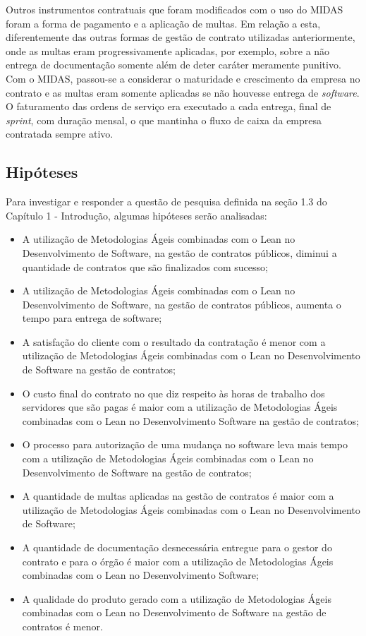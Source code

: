 Outros instrumentos contratuais que foram modificados com o uso do MIDAS foram a forma de pagamento e a aplicação de multas. Em relação a esta, diferentemente das outras formas de gestão de contrato utilizadas anteriormente, onde as multas eram progressivamente aplicadas, por exemplo, sobre a não entrega de documentação somente além de deter caráter meramente punitivo. Com o MIDAS, passou-se a considerar o maturidade e crescimento da empresa no contrato e as multas eram somente aplicadas se não houvesse entrega de \textit{software}. O faturamento das ordens de serviço era executado a cada entrega, final de \textit{sprint}, com duração mensal, o que mantinha o fluxo de caixa da empresa contratada sempre ativo.

\subsection[Hipóteses]{Hipóteses}

Para investigar e responder a questão de pesquisa definida na seção 1.3 do Capítulo 1 - Introdução, algumas hipóteses serão analisadas:
\begin{itemize}
\item  A utilização de Metodologias Ágeis combinadas com o Lean no Desenvolvimento de Software, na gestão de contratos públicos, diminui a quantidade de contratos que são finalizados com sucesso;
\item  A utilização de Metodologias Ágeis combinadas com o Lean no Desenvolvimento de Software, na gestão de contratos públicos, aumenta o tempo para entrega de software;
\item	A satisfação do cliente com o resultado da contratação é menor com a utilização de Metodologias Ágeis combinadas com o Lean no Desenvolvimento de Software na gestão de contratos;
\item  O custo final do contrato no que diz respeito às horas de trabalho dos servidores que são pagas é maior com a utilização de Metodologias Ágeis combinadas com o Lean no Desenvolvimento Software na gestão de contratos;
\item  O processo para autorização de uma mudança no software leva mais tempo com a utilização de Metodologias Ágeis combinadas com o Lean no Desenvolvimento de Software na gestão de contratos;
\item	A quantidade de multas aplicadas na gestão de contratos é maior com a utilização de Metodologias Ágeis combinadas com o Lean no Desenvolvimento de Software;
\item	A quantidade de documentação desnecessária entregue para o gestor do contrato e para o órgão é maior com a utilização de Metodologias Ágeis combinadas com o Lean no Desenvolvimento Software;
\item  A qualidade do produto gerado com a utilização de Metodologias Ágeis combinadas com o Lean no Desenvolvimento de Software na gestão de contratos é menor.
\end{itemize}

